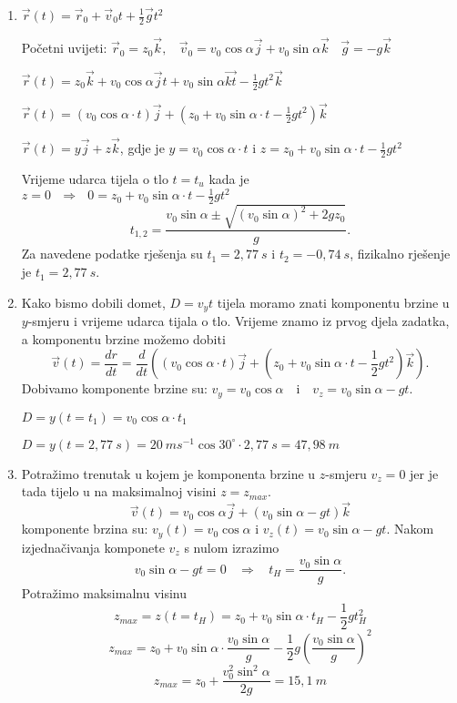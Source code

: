 

\begin{enumerate}[label=\alph*)]
  \item $\vec{r}(t)=\vec{r}_0+\vec{v}_0t+\frac{1}{2}\vec{g}t^2$

Početni uvijeti: $\vec{r}_0=z_0\vec{k},\ \  \ \ \vec{v}_0=v_0\cos\alpha\vec{j}+v_0\sin\alpha\vec{k} \ \ \ \ \vec{g}=-g\vec{k}$

$\vec{r}(t)=z_0\vec{k}+v_0\cos\alpha\vec{j}t+v_0\sin\alpha\vec{kt}-\frac{1}{2}gt^2\vec{k}$

$\vec{r}(t)=(v_0\cos\alpha\cdot t)\vec{j}+   (z_0+v_0\sin\alpha\cdot t-\frac{1}{2}gt^2)\vec{k}$

$\vec{r}(t)=y\vec{j}+z\vec{k}$, gdje je $y=v_0\cos\alpha \cdot t$ i $z= z_0+v_0\sin\alpha\cdot t-\frac{1}{2}gt^2$

Vrijeme udarca tijela o tlo $t=t_u$ kada je $z=0\ \ \ \Rightarrow\ \ \ 0=z_0+v_0\sin\alpha\cdot t-\frac{1}{2}gt^2$ 
$$
t_{1,2}=\frac{v_0\sin\alpha\pm \sqrt{(v_0\sin \alpha)^2+2gz_0} }{g}.
$$
Za navedene podatke rješenja su $t_1=2,77\ s$ i $t_2=-0,74\ s$, fizikalno rješenje je $t_1=2,77\ s$.
\item Kako bismo dobili domet, $D=v_y t $ tijela moramo znati komponentu brzine u $y$-smjeru i vrijeme udarca tijala o tlo. 
Vrijeme znamo iz prvog djela zadatka, a komponentu brzine možemo dobiti
$$\vec{v}(t)=\frac{dr}{dt}=\frac{d}{dt}\left((v_0\cos\alpha\cdot t)\vec{j}+   (z_0+v_0\sin\alpha\cdot t-\frac{1}{2}gt^2)\vec{k}\right).  $$
Dobivamo komponente brzine su: $v_y=v_0\cos\alpha \ \ \ $ i  $\ \ \ v_z=v_0\sin\alpha -gt$. 

$D=y(t=t_1)= v_0\cos\alpha \cdot t_1$

$D=y(t=2,77\ s)= 20\ ms^{-1}\cos30^\circ \cdot 2,77\ s=47,98\ m$
\item Potražimo trenutak u kojem je komponenta brzine u $z$-smjeru $v_z=0$ jer je tada tijelo u na maksimalnoj visini $z=z_{max}$.
$$\vec{v}(t)=v_0\cos\alpha\vec{j}+ (v_0\sin\alpha -gt)\vec{k}$$ 
komponente brzina su: 
$v_y(t)=v_0\cos\alpha$ i  $v_z(t)=v_0\sin\alpha -gt.$
Nakom izjednačivanja komponete $v_z$ s nulom izrazimo
$$v_0\sin\alpha -gt=0\ \ \ \ \Rightarrow  \ \ \ \  t_H=\frac{v_0\sin\alpha}{g}.$$
Potražimo maksimalnu visinu
$$ z_{max} = z(t=t_H)= z_0+v_0\sin\alpha\cdot t_H -\frac{1}{2}gt_H^2$$
$$ z_{max} = z_0+v_0\sin\alpha\cdot \frac{v_0\sin\alpha}{g} -\frac{1}{2}g\left(\frac{v_0\sin\alpha}{g}\right)^2$$
$$ z_{max} = z_0 + \frac{v_0^2\sin^2\alpha}{2g} = 15,1\ m$$
\end{enumerate}
